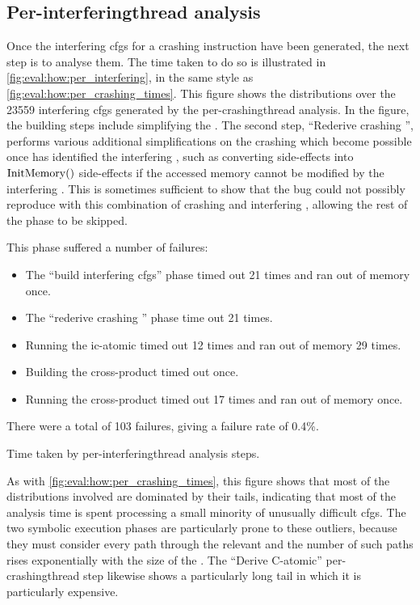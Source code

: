\subsection{Per-\gls{interferingthread} analysis}

Once the interfering \glspl{cfg} for a crashing instruction have been
generated, the next step is to analyse them.  The time taken to do so
is illustrated in \autoref{fig:eval:how:per_interfering}, in the same
style as \autoref{fig:eval:how:per_crashing_times}.  This figure shows
the distributions over the 23559 interfering \glspl{cfg} generated by
the per-\gls{crashingthread} analysis.  In the figure, the
{\StateMachine} building steps include simplifying the
{\StateMachines}.  The second step, ``Rederive crashing
{\StateMachine}'', performs various additional simplifications on the
crashing {\StateMachine} which become possible once {\technique} has
identified the interfering {\StateMachine}, such as converting
\stLoad{}{} side-effects into $\mathrm{InitMemory}()$ side-effects if the accessed
memory cannot be modified by the interfering {\StateMachine}.  This is
sometimes sufficient to show that the bug could not possibly reproduce
with this combination of crashing and interfering {\StateMachines},
allowing the rest of the phase to be skipped.  

This phase suffered a number of failures:
\begin{itemize}
\item The ``build interfering \glspl{cfg}'' phase timed out 21 times
  and ran out of memory once.
\item The ``rederive crashing {\StateMachine}'' phase time out 21
  times.
\item Running the \gls{ic-atomic} {\StateMachine} timed out 12 times
  and ran out of memory 29 times.
\item Building the cross-product {\StateMachine} timed out once.
\item Running the cross-product {\StateMachine} timed out 17 times and
  ran out of memory once.
\end{itemize}
There were a total of 103 failures, giving a failure rate of 0.4\%.

\begin{sanefig}
  \centerline{
  }
  \caption{Time taken by per-\gls{interferingthread} analysis steps.}
\end{sanefig}

As with \autoref{fig:eval:how:per_crashing_times}, this figure shows
that most of the distributions involved are dominated by their tails,
indicating that most of the analysis time is spent processing a small
minority of unusually difficult \glspl{cfg}.  The two symbolic
execution phases are particularly prone to these outliers, because
they must consider every path through the relevant {\StateMachine} and
the number of such paths rises exponentially with the size of the
{\StateMachine}.  The ``Derive C-atomic'' per-\gls{crashingthread}
step likewise shows a particularly long tail in which it is
particularly expensive.

